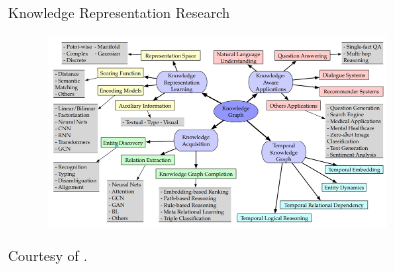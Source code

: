 \begin{frame}{Knowledge Representation Research}
\tiny
\begin{figure}
    \centering
    \includegraphics[width=0.8\textwidth]{graphics/appendix/knowledge_graph_research.PNG}
\end{figure}
Courtesy of \cite{Ji2020AApplications}.
\end{frame}
